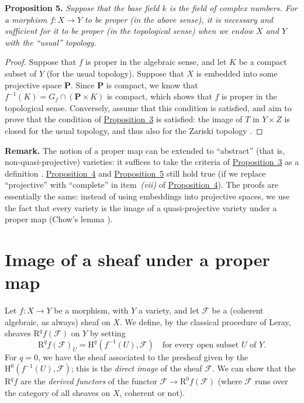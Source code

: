 \documentclass{article}
\newenvironment{itenv}[1]
  {\phantomsection\par\medskip\noindent\textbf{#1.}\itshape}
  {\medskip}
\newenvironment{rmenv}[1]
  {\phantomsection\par\medskip\noindent\textbf{#1.}\rmfamily}
  {\medskip}
\newcommand{\scr}[1]{{\mathscr{#1}}}
\newcommand{\HH}{\mathrm{H}}
\newcommand{\RR}{\mathrm{R}}
\newcommand{\PP}{\mathbf{P}}
\newcommand{\oldpage}[1]{\marginpar{\footnotesize$\Big\vert$ \textit{p.~#1}}}
\begin{document}
\begin{itenv}{Proposition 5}
\label{proposition5}
  Suppose that the base field $k$ is the field of complex numbers.
  For a morphism $f\colon X\to Y$ to be proper (in the above sense), it is necessary and sufficient for it to be proper (in the topological sense) when we endow $X$ and $Y$ with the ``usual'' topology.
\end{itenv}

\begin{proof}
  Suppose that $f$ is proper in the algebraic sense, and let $K$ be a compact subset of $Y$ (for the usual topology).
  Suppose that $X$ is embedded into some projective space $\PP$.
  Since $\PP$ is compact, we know that $f^{-1}(K)=G_f\cap(\PP\times K)$ is compact, which shows that $f$ is proper in the topological sense.
  Conversely, assume that this condition is satisfied, and aim to prove that the condition of \hyperref[proposition3]{Proposition~3} is satisfied:
\oldpage{102}
  the image of $T$ in $Y\times Z$ is closed for the usual topology, and thus also for the Zariski topology \cite[proposition~7, p.~12]{13}.
\end{proof}

\begin{rmenv}{Remark}
  The notion of a proper map can be extended to ``abstract'' (that is, non-quasi-projective) varieties:
  it suffices to take the criteria of \hyperref[proposition3]{Proposition~3} as a definition \cite{4}.
  \hyperref[proposition4]{Proposition~4} and \hyperref[proposition5]{Proposition~5} still hold true (if we replace ``projective'' with ``complete'' in item~\emph{(vii)} of \hyperref[proposition4]{Proposition~4}).
  The proofs are essentially the same:
  instead of using embeddings into projective spaces, we use the fact that every variety is the image of a quasi-projective variety under a proper map (Chow's lemma \cite{4,14}).
\end{rmenv}


\section{Image of a sheaf under a proper map}
\label{section3}

Let $f\colon X\to Y$ be a morphism, with $Y$ a variety, and let $\scr{F}$ be a (coherent algebraic, as always) sheaf on $X$.
We define, by the classical procedure of Leray, sheaves $\RR^qf(\scr{F})$ on $Y$ by setting
\[
  \RR^qf(\scr{F})_U = \HH^q(f^{-1}(U),\scr{F})
  \quad\mbox{for every open subset $U$ of $Y$.}
\]
For $q=0$, we have the sheaf associated to the presheaf given by the $\HH^0(f^{-1}(U),\scr{F})$;
this is the \emph{direct image} of the sheaf $\scr{F}$.
We can show \cite{7} that the $\RR^qf$ are the \emph{derived functors} of the functor $\scr{F}\to\RR^0f(\scr{F})$ (where $\scr{F}$ runs over the category of all sheaves on $X$, coherent or not).
\end{document}
